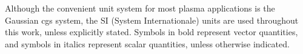 Although the convenient unit system for most plasma applications is the Gaussian cgs system, the SI (System Internationale) units are used throughout this work, unless explicitly stated. Symbols in bold represent vector quantities, and symbols in italics represent scalar quantities, unless otherwise indicated.
